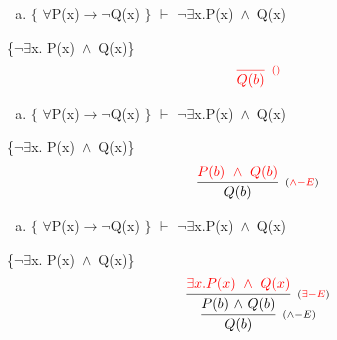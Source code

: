 \documentclass[aspectratio=43]{beamer}
\newcommand{\ria}{$\rightarrow$}
\newcommand{\fall}{$\forall$}
\newcommand{\ex}{$\exists$}
\newcommand{\nao}{$\neg$}
\newcommand{\nex}{\nao\ex}
\newcommand{\andd}{$\wedge$}
\begin{document}
    \begin{frame}[fragile]
    	
    	\begin{enumerate}[b)]
			
			\item $\{$ \fall P(x)\ria \nao Q(x) $\}$ $\vdash$ \nex  x.P(x)\ \andd\ Q(x) \\ 
			
		\end{enumerate}
        \{\nex  x. P(x)\ \andd\ Q(x)\}
        \vspace{100pt}
        \[
        \begin{array}{c}
		
        	\textcolor{red}{
            \infer[_{()}]
            {Q(b)}
            {}
            }
		\end{array}
        \]
        
	\end{frame}
    
    \begin{frame}[fragile]
    	
    	\begin{enumerate}[b)]
			
			\item $\{$ \fall P(x)\ria \nao Q(x) $\}$ $\vdash$ \nex  x.P(x)\ \andd\ Q(x) \\ 
			
		\end{enumerate}
        \{\nex  x. P(x)\ \andd\ Q(x)\}
        \vspace{95pt}
        \[
        \begin{array}{c}
		
        	\infer[_{(\textcolor{red}{\land-E})}]
            {Q(b)}
            {\textcolor{red}{P(b)\ \wedge \ Q(b)}}
		\end{array}
        \]
        
	\end{frame}
    
    \begin{frame}[fragile]
    	
    	\begin{enumerate}[b)]
			
			\item $\{$ \fall P(x)\ria \nao Q(x) $\}$ $\vdash$ \nex  x.P(x)\ \andd\ Q(x) \\ 
			
		\end{enumerate}
        \{\nex  x. P(x)\ \andd\ Q(x)\}
        \vspace{90pt}
        \[
        \begin{array}{c}
		
        	\infer[_{(\land-E)}]
            {Q(b)}
            {\infer[_{(\textcolor{red}{\exists-E})}]
                {P(b)\ $\andd$\ Q(b)}
            	{\textcolor{red}{\exists x.P(x)\ \wedge\ Q(x)}}
            }
		\end{array}
        \]
        
	\end{frame}
    
\end{document}
